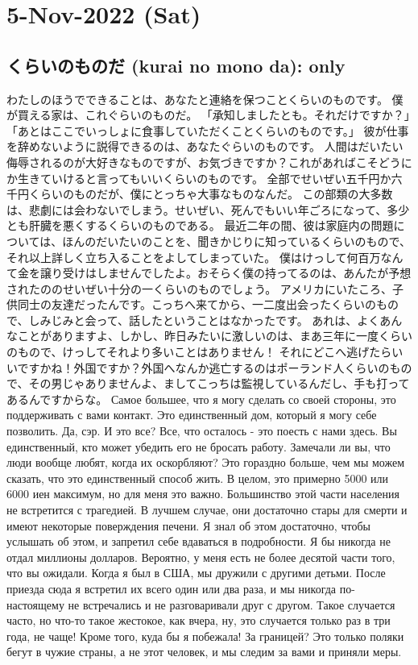 \section{5-Nov-2022 (Sat)}
\subsection{くらいのものだ (kurai no mono da): only}

わたしのほうでできることは、あなたと連絡を保つことくらいのものです。
僕が買える家は、これぐらいのものだ。
「承知しましたとも。それだけですか？」「あとはここでいっしょに食事していただくことくらいのものです。」
彼が仕事を辞めないように説得できるのは、あなたぐらいのものです。
人間はだいたい侮辱されるのが大好きなものですが、お気づきですか？これがあればこそどうにか生きていけると言ってもいいくらいのものです。
全部でせいぜい五千円か六千円くらいのものだが、僕にとっちゃ大事なものなんだ。
この部類の大多数は、悲劇には会わないでしまう。せいぜい、死んでもいい年ごろになって、多少とも肝臓を悪くするくらいのものである。
最近二年の間、彼は家庭内の問題については、ほんのだいたいのことを、聞きかじりに知っているくらいのもので、それ以上詳しく立ち入ることをよしてしまっていた。
僕はけっして何百万なんて金を譲り受けはしませんでしたよ。おそらく僕の持ってるのは、あんたが予想されたののせいぜい十分の一くらいのものでしょう。
アメリカにいたころ、子供同士の友達だったんです。こっちへ来てから、一二度出会ったくらいのもので、しみじみと会って、話したということはなかったです。
あれは、よくあんなことがありますよ、しかし、昨日みたいに激しいのは、まあ三年に一度くらいのもので、けっしてそれより多いことはありません！
それにどこへ逃げたらいいですかね！外国ですか？外国へなんか逃亡するのはポーランド人くらいのもので、その男じゃありませんよ、ましてこっちは監視しているんだし、手も打ってあるんですからな。
Самое большее, что я могу сделать со своей стороны, это поддерживать с вами контакт.
Это единственный дом, который я могу себе позволить.
Да, сэр. И это все? Все, что осталось - это поесть с нами здесь.
Вы единственный, кто может убедить его не бросать работу.
Замечали ли вы, что люди вообще любят, когда их оскорбляют? Это гораздно больше, чем мы можем сказать, что это единственный способ жить.
В целом, это примерно 5000 или 6000 иен максимум, но для меня это важно.
Большинство этой части населения не встретится с трагедией. В лучшем случае, они достаточно стары для смерти и имеют некоторые поверждения печени.
Я знал об этом достаточно, чтобы услышать об этом, и запретил себе вдаваться в подробности.
Я бы никогда не отдал миллионы долларов. Вероятно, у меня есть не более десятой части того, что вы ожидали.
Когда я был в США, мы дружили с другими детьми. После приезда сюда я встретил их всего один или два раза, и мы никогда по-настоящему не встречались и не разговаривали друг с другом.
Такое случается часто, но что-то такое жестокое, как вчера, ну, это случается только раз в три года, не чаще!
Кроме того, куда бы я побежала! За границей? Это только поляки бегут в чужие страны, а не этот человек, и мы следим за вами и приняли меры.

